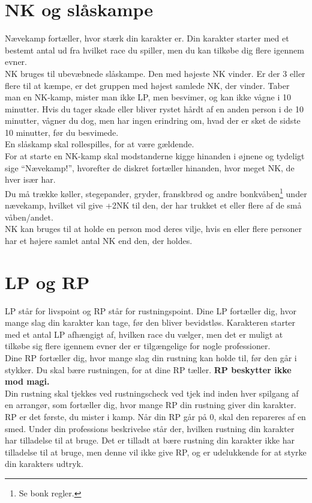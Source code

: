 \section*{NK og slåskampe}
Nævekamp fortæller, hvor stærk din karakter er. Din karakter starter med et bestemt antal ud fra hvilket race du spiller, men du kan tilkøbe dig flere igennem evner.\\
NK bruges til ubevæbnede slåskampe. Den med højeste NK vinder. Er der 3 eller flere til at kæmpe, er det gruppen med højest samlede NK, der vinder. Taber man en NK-kamp, mister man ikke LP, men besvimer, og kan ikke vågne i 10 minutter. Hvis du tager skade eller bliver rystet hårdt af en anden person i de 10 minutter, vågner du dog, men har ingen erindring om, hvad der er sket de sidste 10 minutter, før du besvimede.\\
En slåskamp skal rollespilles, for at være gældende.\\
For at starte en NK-kamp skal modstanderne kigge hinanden i øjnene og tydeligt sige “Nævekamp!”, hvorefter de diskret fortæller hinanden, hvor meget NK, de hver især har.\\
Du må trække  køller, stegepander, gryder, franskbrød og andre bonkvåben\footnote{Se bonk regler.} under nævekamp, hvilket vil give +2NK til den, der har trukket et eller flere af de små våben/andet.\\
NK kan bruges til at holde en person mod deres vilje, hvis en eller flere personer har et højere samlet antal NK end den, der holdes.

\section*{LP og RP}
LP står for livspoint og RP står for rustningspoint. Dine LP fortæller dig, hvor mange slag din karakter kan tage, før den bliver bevidstløs. Karakteren starter med et antal LP afhængigt af, hvilken race du vælger, men det er muligt at tilkøbe sig flere igennem evner der er tilgængelige for nogle professioner.\\
Dine RP fortæller dig, hvor mange slag din rustning kan holde til, før den går i stykker. Du skal bære rustningen, for at dine RP tæller. \textbf{RP beskytter ikke mod magi.}\\
Din rustning skal tjekkes ved rustningscheck ved tjek ind inden hver spilgang af en arrangør, som fortæller dig, hvor mange RP din rustning giver din karakter. RP er det første, du mister i kamp. Når din RP går på 0, skal den repareres af en smed. Under din professions beskrivelse står der, hvilken rustning din karakter har tilladelse til at bruge. Det er tilladt at bære rustning din karakter ikke har tilladelse til at bruge, men denne vil ikke give RP, og er udelukkende for at styrke din karakters udtryk.

